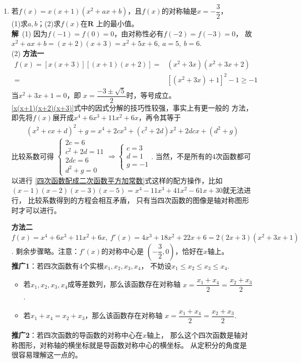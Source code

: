 \begin{enumerate}[label={【\textbf{例\thechapter.\arabic*}】},
 leftmargin=\inteval{\myenumleftmargin}pt,
 itemsep=\inteval{\myenumitempsep}pt,
 itemindent=\inteval{\myenumitemindent}pt]
\item \label{四次函数的轴对称性}
若$ f(x)=x(x+1)(x^2+ax+b) $，且$ f(x) $的对称轴是$ x=
-\dfrac{3}{2} $，\\ (1)求$ a,b $；\quad (2)求$ f(x) $在$ \textbf{R} $
上的最小值。\\
\textbf{解}\ (1) 因为$ f(-1)=f(0)=0 $，由对称性必有$ f(-2)=f(-3)=0 $，
故$ x^2+ax+b=(x+2)(x+3)=x^2+5x+6,\ a=5,\ b=6 $. \\
(2) \textbf{方法一}
\begin{align}\label{x(x+1)(x+2)(x+3)}
    f(x)=[x(x+3)][(x+1)(x+2)]=&(x^2+3x)(x^2+3x+2) \\
    =&[(x^2+3x)+1]^2-1 \geq -1 
\end{align}
当$ x^2+3x+1=0 $，即 $ x=\dfrac{-3\pm\sqrt{5}}{2} $时，等号成立。\\
\eqref{x(x+1)(x+2)(x+3)}式中的因式分解的技巧性较强，事实上有更一般的
方法，即先将$ f(x) $展开成$ x^4 + 6x^3 + 11x^2 + 6x $，再令其等于
\begin{gather}\label{四次函数配成二次函数平方加常数}
    (x^2+cx+d)^2+g=x^4+2cx^3+(c^2+2d)x^2+2dcx+(d^2+g) 
\end{gather}
比较系数可得
$ \begin{cases}
    2c=6 \\
    c^2+2d=11 \\
    2dc=6 \\
    d^2+g=0
\end{cases} \Rightarrow 
\begin{cases}
    c=3 \\
    d=1\\
    g=-1
\end{cases} $. 当然，不是所有的4次函数都可以进行
\eqref{四次函数配成二次函数平方加常数}式这样的配方操作，比如
$ (x-1)(x-2)(x-3)(x-5)=x^4-11x^3+41x^2-61x+30 $就无法进行，
比较系数得到的方程会相互矛盾，
只有当四次函数的图像是轴对称图形时才可以进行。

\textbf{方法二}\ $ f(x)=x^4 + 6x^3 + 11x^2 + 6x,\ f'(x)=4x^3+18x^2+22x+6=
2(2x + 3)(x^2 + 3x + 1) $. 剩余步骤略。注意：$ f'(x) $的对称中心是
$ \left(-\dfrac{3}{2},0\right ) $，恰好在$ x $轴上。\\
\textbf{推广1}：若四次函数有4个实根$ x_1,x_2,x_3,x_4 $，
不妨设$ x_1\leq x_2\leq x_3\leq x_4 $. 
\begin{itemize}[itemsep=-1pt]
    \item 若$ x_1,x_2,x_3,x_4 $成等差数列，那么该函数存在对称轴
    $ x=\dfrac{x_1+x_4}{2}=\dfrac{x_2+x_3}{2} $. 
    \item 若$ x_1+x_4=x_2+x_3 $，那么该函数存在对称轴
    $ x=\dfrac{x_1+x_4}{2}=\dfrac{x_2+x_3}{2} $.
\end{itemize}
\textbf{推广2}：若四次函数的导函数的对称中心在$ x $轴上，
那么这个四次函数是轴对称图形，对称轴的横坐标就是导函数对称中心的横坐标。
从定积分的角度是很容易理解这一点的。


\end{enumerate}
